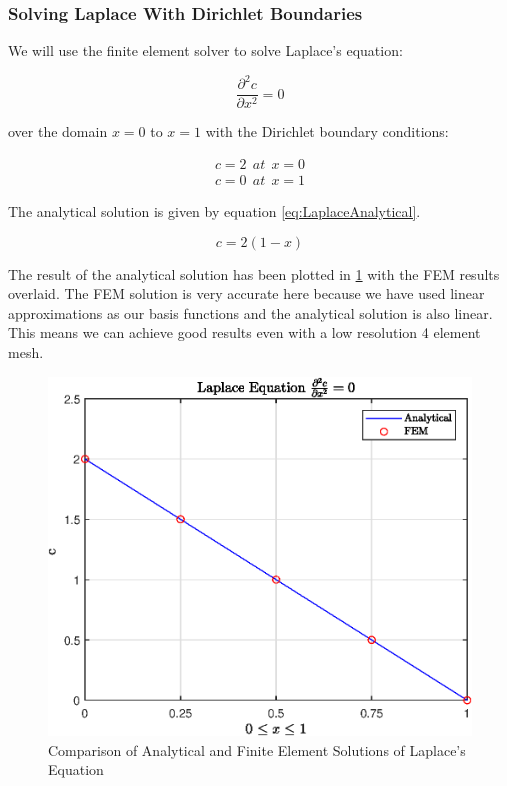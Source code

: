 \documentclass[11pt]{article}
\begin{document}
\subsubsection{Solving Laplace With Dirichlet Boundaries}

We will use the finite element solver to solve Laplace's equation: 

\begin{equation}
\label{eq:Laplace}
\frac{\partial^2 c}{\partial x^2} = 0
\end{equation}

over the domain $x = 0$ to $x = 1$ with the Dirichlet boundary conditions:

\begin{subequations}\label{eq:LaplaceBCs}
\begin{align}
c = 2 \ \ at \ \ x = 0 \\
c = 0 \ \ at \ \ x  = 1
\end{align}
\end{subequations}

The analytical solution is given by equation \ref{eq:LaplaceAnalytical}.

\begin{equation}\label{eq:LaplaceAnalytical}
c = 2(1-x)
\end{equation}

The result of the analytical solution has been plotted in \ref{fig:LaplaceFig1} with the FEM results overlaid. The FEM solution is very accurate here because we have used linear approximations as our basis functions and the analytical solution is also linear. This means we can achieve good results even with a low resolution 4 element mesh.

\begin{figure}[h!] 
    \centering
    \includegraphics{epsLaplaceFig1}
    \caption{Comparison of Analytical and Finite Element Solutions of Laplace's Equation}\label{fig:LaplaceFig1}
\end{figure}
\end{document}
